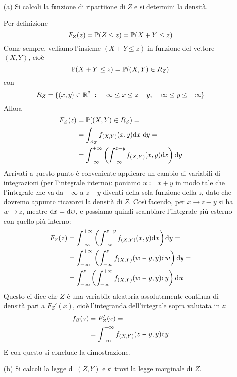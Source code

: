 \Soluzione{}
\begin{enumerate}
\item [(a)] Si calcoli la funzione di ripartiione di $Z$ e si determini la densità.

Per definizione
\[
F_Z(z)=\mathbb{P}(Z\leq z)=\mathbb{P}(X+Y\leq z)
\]
Come sempre, vediamo l'insieme $(X+Y\leq z)$ in funzione del vettore $(X,Y)$, cioè
\[
\mathbb{P}(X+Y\leq z)=\mathbb{P}((X,Y)\in R_Z)
\]
con 
\[
R_Z=\{(x,y)\in\RR^2\ :\ -\infty\leq x\leq z-y,\ -\infty\leq y\leq +\infty  \}
\]
Allora
\begin{gather*}
\begin{aligned}
F_Z(z)&=\mathbb{P}((X,Y)\in R_Z)=\\
&=\int_{R_Z}f_{(X,Y)}(x,y)\mathrm{d} x\ \mathrm{d} y =\\
&=\int_{-\infty}^{+\infty} \left(\int_{-\infty}^{z-y}f_{(X,Y)}(x,y)\mathrm{d} x   \right)\mathrm{d} y
\end{aligned}
\end{gather*}
Arrivati a questo punto è conveniente applicare un cambio di variabili di integrazioni (per l'integrale interno): poniamo $w\coloneqq x+y$ in modo tale che l'integrale che va da $-\infty$ a $z-y$ diventi della sola funzione della $z$, dato che dovremo appunto ricavarci la densità di $Z$. Così facendo, per $x\to z-y$ si ha $w\to z$, mentre $\mathrm{d} x=\mathrm{d} w$, e possiamo quindi scambiare l'integrale più esterno con quello più interno:
\begin{gather*}
\begin{aligned}
F_Z(z)&=\int_{-\infty}^{+\infty} \left(\int_{-\infty}^{z-y}f_{(X,Y)}(x,y)\mathrm{d} x   \right)\mathrm{d} y=\\
&=\int_{-\infty}^{+\infty} \left(\int_{-\infty}^{z}f_{(X,Y)}(w-y,y)\mathrm{d} w   \right)\mathrm{d} y=\\
&=\int_{-\infty}^{z}\left(\int_{-\infty}^{+\infty} f_{(X,Y)}(w-y,y)\mathrm{d} y    \right)\mathrm{d} w
\end{aligned}
\end{gather*}
Questo ci dice che $Z$ è una variabile aleatoria assolutamente continua di densità pari a $F_Z'(x)$, cioè l'integranda dell'integrale sopra valutata in $z$:
\begin{gather*}
\begin{aligned}
f_Z(z)&=F_Z'(x)=\\
&=\int_{-\infty}^{+\infty} f_{(X,Y)}(z-y,y)\mathrm{d} y
\end{aligned}
\end{gather*}
E con questo si conclude la dimostrazione.

\item [(b)] Si calcoli la legge di $(Z,Y)$ e si trovi la legge marginale di $Z$.


\end{enumerate}

